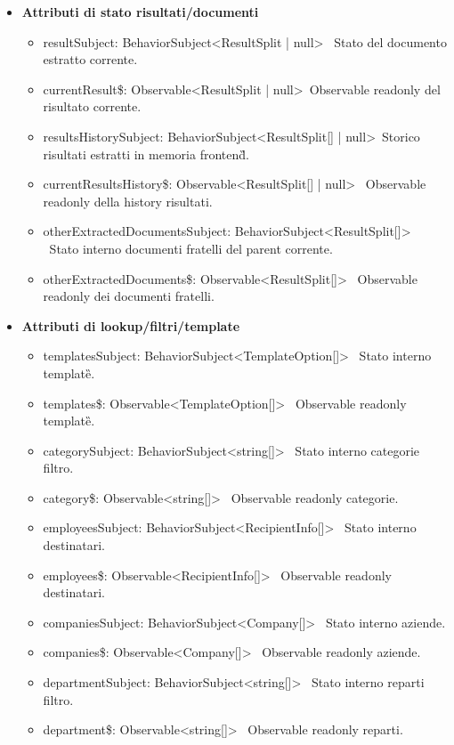 \documentclass[a4paper,11pt]{article}
\begin{document}
\begin{itemize}[noitemsep, topsep=0pt]
\begin{itemize}[noitemsep, topsep=0pt]
\item currentParentPageCounts\$: Observable<Record<number, number{>}{>} \ Observable readonly conteggio pagine parent.
\end{itemize}
\item \textbf{Attributi di stato risultati/documenti}
\begin{itemize}[noitemsep, topsep=0pt]
\item resultSubject: BehaviorSubject<ResultSplit | null> \ Stato del documento estratto corrente.
\item currentResult\$: Observable<ResultSplit | null>\ Observable readonly del risultato corrente.
\item resultsHistorySubject: BehaviorSubject<ResultSplit[] | null>\ Storico risultati estratti in memoria frontend\G{}.
\item currentResultsHistory\$: Observable<ResultSplit[] | null> \ Observable readonly della history risultati.
\item otherExtractedDocumentsSubject: BehaviorSubject<ResultSplit[]> \ Stato interno documenti fratelli del parent corrente.
\item otherExtractedDocuments\$: Observable<ResultSplit[]> \ Observable readonly dei documenti fratelli.
\end{itemize}
\item \textbf{Attributi di lookup/filtri/template}
\begin{itemize}[noitemsep, topsep=0pt]
\item templatesSubject: BehaviorSubject<TemplateOption[]> \ Stato interno template\G{}.
\item templates\$: Observable<TemplateOption[]> \ Observable readonly template\G{}.
\item categorySubject: BehaviorSubject<string[]> \ Stato interno categorie filtro.
\item category\$: Observable<string[]> \ Observable readonly categorie.
\item employeesSubject: BehaviorSubject<RecipientInfo[]> \ Stato interno destinatari.
\item employees\$: Observable<RecipientInfo[]> \ Observable readonly destinatari.
\item companiesSubject: BehaviorSubject<Company[]> \ Stato interno aziende.
\item companies\$: Observable<Company[]> \ Observable readonly aziende.
\item departmentSubject: BehaviorSubject<string[]> \ Stato interno reparti filtro.
\item department\$: Observable<string[]> \ Observable readonly reparti.

\end{itemize}
\end{itemize}
\end{document}
